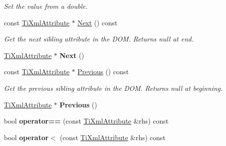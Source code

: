 \begin{DoxyCompactItemize}
\begin{DoxyCompactList}\small\item\em \-Set the value from a double. \end{DoxyCompactList}\item 
\hypertarget{class_ti_xml_attribute_a776478980776a024f7c2846eec640f65}{
const \hyperlink{class_ti_xml_attribute}{\-Ti\-Xml\-Attribute} $\ast$ \hyperlink{class_ti_xml_attribute_a776478980776a024f7c2846eec640f65}{\-Next} () const }
\label{class_ti_xml_attribute_a776478980776a024f7c2846eec640f65}

\begin{DoxyCompactList}\small\item\em \-Get the next sibling attribute in the \-D\-O\-M. \-Returns null at end. \end{DoxyCompactList}\item 
\hypertarget{class_ti_xml_attribute_a138320aa7793b148ba7e5bd0a0ea4db6}{
\hyperlink{class_ti_xml_attribute}{\-Ti\-Xml\-Attribute} $\ast$ {\bfseries \-Next} ()}
\label{class_ti_xml_attribute_a138320aa7793b148ba7e5bd0a0ea4db6}

\item 
\hypertarget{class_ti_xml_attribute_a54a5f8730c7b02b9a41b74e12e27fe86}{
const \hyperlink{class_ti_xml_attribute}{\-Ti\-Xml\-Attribute} $\ast$ \hyperlink{class_ti_xml_attribute_a54a5f8730c7b02b9a41b74e12e27fe86}{\-Previous} () const }
\label{class_ti_xml_attribute_a54a5f8730c7b02b9a41b74e12e27fe86}

\begin{DoxyCompactList}\small\item\em \-Get the previous sibling attribute in the \-D\-O\-M. \-Returns null at beginning. \end{DoxyCompactList}\item 
\hypertarget{class_ti_xml_attribute_ae4dabc932cba945ed1e92fec5f121193}{
\hyperlink{class_ti_xml_attribute}{\-Ti\-Xml\-Attribute} $\ast$ {\bfseries \-Previous} ()}
\label{class_ti_xml_attribute_ae4dabc932cba945ed1e92fec5f121193}

\item 
\hypertarget{class_ti_xml_attribute_ae48c2a65b520d453914ce4e845d607cf}{
bool {\bfseries operator==} (const \hyperlink{class_ti_xml_attribute}{\-Ti\-Xml\-Attribute} \&rhs) const }
\label{class_ti_xml_attribute_ae48c2a65b520d453914ce4e845d607cf}

\item 
\hypertarget{class_ti_xml_attribute_adb8b6f2cad5948e73e383182e7ce10de}{
bool {\bfseries operator$<$} (const \hyperlink{class_ti_xml_attribute}{\-Ti\-Xml\-Attribute} \&rhs) const }
\label{class_ti_xml_attribute_adb8b6f2cad5948e73e383182e7ce10de}


\end{DoxyCompactItemize}

